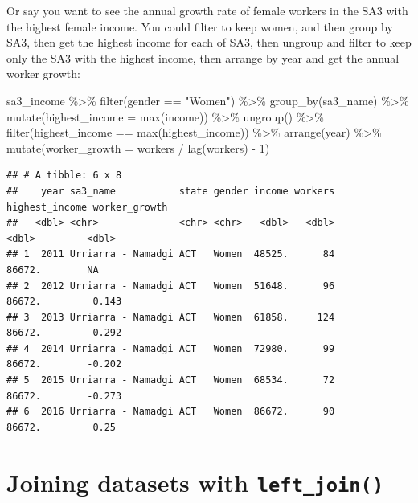\documentclass[
]{book}
\newenvironment{Shaded}{\begin{snugshade}}{\end{snugshade}}
\newcommand{\AttributeTok}[1]{\textcolor[rgb]{0.77,0.63,0.00}{#1}}
\newcommand{\DecValTok}[1]{\textcolor[rgb]{0.00,0.00,0.81}{#1}}
\newcommand{\FunctionTok}[1]{\textcolor[rgb]{0.00,0.00,0.00}{#1}}
\newcommand{\NormalTok}[1]{#1}
\newcommand{\SpecialCharTok}[1]{\textcolor[rgb]{0.00,0.00,0.00}{#1}}
\newcommand{\StringTok}[1]{\textcolor[rgb]{0.31,0.60,0.02}{#1}}
\begin{document}
Or say you want to see the annual growth rate of female workers in the SA3 with the highest female income. You could filter to keep women, and then group by SA3, then get the highest income for each of SA3, then ungroup and filter to keep only the SA3 with the highest income, then arrange by year and get the annual worker growth:

\begin{Shaded}
\begin{Highlighting}[]
\NormalTok{sa3\_income }\SpecialCharTok{\%\textgreater{}\%} 
  \FunctionTok{filter}\NormalTok{(gender }\SpecialCharTok{==} \StringTok{"Women"}\NormalTok{) }\SpecialCharTok{\%\textgreater{}\%} 
  \FunctionTok{group\_by}\NormalTok{(sa3\_name) }\SpecialCharTok{\%\textgreater{}\%} 
  \FunctionTok{mutate}\NormalTok{(}\AttributeTok{highest\_income =} \FunctionTok{max}\NormalTok{(income)) }\SpecialCharTok{\%\textgreater{}\%} 
  \FunctionTok{ungroup}\NormalTok{() }\SpecialCharTok{\%\textgreater{}\%} 
  \FunctionTok{filter}\NormalTok{(highest\_income }\SpecialCharTok{==} \FunctionTok{max}\NormalTok{(highest\_income)) }\SpecialCharTok{\%\textgreater{}\%} 
  \FunctionTok{arrange}\NormalTok{(year) }\SpecialCharTok{\%\textgreater{}\%} 
  \FunctionTok{mutate}\NormalTok{(}\AttributeTok{worker\_growth =}\NormalTok{ workers }\SpecialCharTok{/} \FunctionTok{lag}\NormalTok{(workers) }\SpecialCharTok{{-}} \DecValTok{1}\NormalTok{)}
\end{Highlighting}
\end{Shaded}

\begin{verbatim}
## # A tibble: 6 x 8
##    year sa3_name           state gender income workers highest_income worker_growth
##   <dbl> <chr>              <chr> <chr>   <dbl>   <dbl>          <dbl>         <dbl>
## 1  2011 Urriarra - Namadgi ACT   Women  48525.      84         86672.        NA    
## 2  2012 Urriarra - Namadgi ACT   Women  51648.      96         86672.         0.143
## 3  2013 Urriarra - Namadgi ACT   Women  61858.     124         86672.         0.292
## 4  2014 Urriarra - Namadgi ACT   Women  72980.      99         86672.        -0.202
## 5  2015 Urriarra - Namadgi ACT   Women  68534.      72         86672.        -0.273
## 6  2016 Urriarra - Namadgi ACT   Women  86672.      90         86672.         0.25
\end{verbatim}

\hypertarget{joining-datasets-with-left_join}{%
\section{\texorpdfstring{Joining datasets with \texttt{left\_join()}}{Joining datasets with left\_join()}}\label{joining-datasets-with-left_join}}
\end{document}
